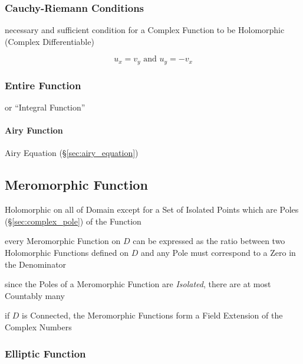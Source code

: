 \subsubsection{Cauchy-Riemann Conditions}\label{sec:cauchy_riemann}

necessary and sufficient condition for a Complex Function to be Holomorphic
(Complex Differentiable)

\[
  u_x = v_y \text{ and } u_y = - v_x
\]



\subsubsection{Entire Function}\label{sec:entire_function}

or ``Integral Function''



\paragraph{Airy Function}\label{sec:airy_function}\hfill

Airy Equation (\S\ref{sec:airy_equation})



\subsection{Meromorphic Function}\label{sec:meromorphic_function}

Holomorphic on all of Domain except for a Set of Isolated Points which are
Poles (\S\ref{sec:complex_pole}) of the Function

every Meromorphic Function on $D$ can be expressed as the ratio between two
Holomorphic Functions defined on $D$ and any Pole must correspond to a Zero in
the Denominator

since the Poles of a Meromorphic Function are \emph{Isolated}, there are at
most Countably many

if $D$ is Connected, the Meromorphic Functions form a Field Extension of the
Complex Numbers



\subsubsection{Elliptic Function}\label{sec:elliptic_function}

